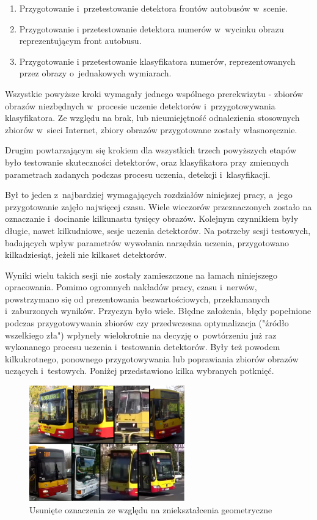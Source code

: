 \begin{enumerate}
	\item Przygotowanie i~przetestowanie detektora frontów autobusów w~scenie.
	\item Przygotowanie i przetestowanie detektora numerów w~wycinku obrazu
	reprezentującym front autobusu.
	\item Przygotowanie i przetestowanie klasyfikatora numerów, reprezentowanych
	przez obrazy o~jednakowych wymiarach.
\end{enumerate}

Wszystkie powyższe kroki wymagały jednego wspólnego prerekwizytu - zbiorów obrazów
niezbędnych w~procesie uczenie detektorów i~przygotowywania klasyfikatora.
Ze względu na brak, lub nieumiejętność odnalezienia stosownych zbiorów
w~sieci Internet, zbiory obrazów przygotowane zostały własnoręcznie.

Drugim powtarzającym się krokiem dla wszystkich trzech powyższych etapów było
testowanie skuteczności detektorów, oraz klasyfikatora przy zmiennych
parametrach zadanych podczas procesu uczenia, detekcji i~klasyfikacji.

Był to jeden z~najbardziej wymagających rozdziałów niniejszej pracy, a~jego
przygotowanie zajęło najwięcej czasu. Wiele wieczorów przeznaczonych zostało 
na oznaczanie i~docinanie kilkunastu tysięcy obrazów. Kolejnym czynnikiem były długie,
nawet kilkudniowe, sesje uczenia detektorów. Na potrzeby sesji testowych,
badających wpływ parametrów wywołania narzędzia uczenia, przygotowano
kilkadziesiąt, jeżeli nie kilkaset detektorów.

Wyniki wielu takich sesji nie zostały zamieszczone na łamach niniejszego opracowania.
Pomimo ogromnych nakładów pracy, czasu i~nerwów, powstrzymano się
od prezentowania bezwartościowych, przekłamanych i~zaburzonych wyników.
Przyczyn było wiele.
Błędne założenia, błędy popełnione podczas przygotowywania zbiorów czy 
przedwczesna optymalizacja ("źródło wszelkiego zła") wpłyneły wielokrotnie
na decyzję o~powtórzeniu już raz wykonanego procesu uczenia i~testowania
detektorów. Były też powodem kilkukrotnego, ponownego przygotowywania lub poprawiania
zbiorów obrazów uczących i~testowych. Poniżej przedstawiono kilka wybranych 
potknięć.

\begin{figure}[h!]
	\centering
	\includegraphics[width=0.6\textwidth]{img/exp_removed_distorted_fronts}
	\caption{Usunięte oznaczenia ze względu na zniekształcenia geometryczne}
	\label{fig:deformation_samples}
\end{figure}

